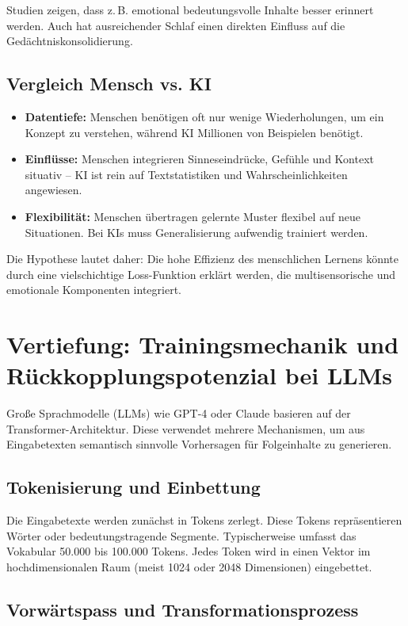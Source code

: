 Studien zeigen, dass z.\,B. emotional bedeutungsvolle Inhalte besser erinnert werden. Auch hat ausreichender Schlaf einen direkten Einfluss auf die Gedächtniskonsolidierung.

\subsection{Vergleich Mensch vs. KI}
\begin{itemize}
    \item \textbf{Datentiefe:} Menschen benötigen oft nur wenige Wiederholungen, um ein Konzept zu verstehen, während KI Millionen von Beispielen benötigt.
    \item \textbf{Einflüsse:} Menschen integrieren Sinneseindrücke, Gefühle und Kontext situativ – KI ist rein auf Textstatistiken und Wahrscheinlichkeiten angewiesen.
    \item \textbf{Flexibilität:} Menschen übertragen gelernte Muster flexibel auf neue Situationen. Bei KIs muss Generalisierung aufwendig trainiert werden.
\end{itemize}

Die Hypothese lautet daher: Die hohe Effizienz des menschlichen Lernens könnte durch eine vielschichtige Loss-Funktion erklärt werden, die multisensorische und emotionale Komponenten integriert.

\section{Vertiefung: Trainingsmechanik und Rückkopplungspotenzial bei LLMs}

Große Sprachmodelle (LLMs) wie GPT-4 oder Claude basieren auf der Transformer-Architektur. Diese verwendet mehrere Mechanismen, um aus Eingabetexten semantisch sinnvolle Vorhersagen für Folgeinhalte zu generieren.

\subsection{Tokenisierung und Einbettung}

Die Eingabetexte werden zunächst in Tokens zerlegt. Diese Tokens repräsentieren Wörter oder bedeutungstragende Segmente. Typischerweise umfasst das Vokabular 50.000 bis 100.000 Tokens. Jedes Token wird in einen Vektor im hochdimensionalen Raum (meist 1024 oder 2048 Dimensionen) eingebettet.

\subsection{Vorwärtspass und Transformationsprozess}

